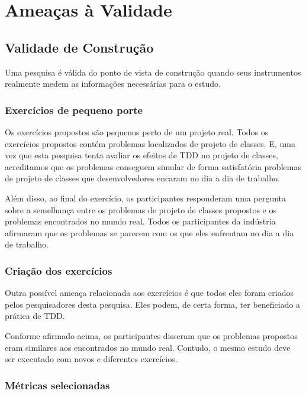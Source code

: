 \chapter{Ameaças à Validade}
\label{cap:ameacas}

\section{Validade de Construção}

Uma pesquisa é válida do ponto de vista de construção quando seus instrumentos realmente
medem as informações necessárias para o estudo.

\subsection{Exercícios de pequeno porte}

Os exercícios propostos são pequenos perto de um projeto real. Todos os exercícios propostos contém
problemas localizados de projeto de classes. E, uma vez que esta pesquisa tenta avaliar os efeitos de TDD no projeto de classes, 
acreditamos que os problemas conseguem simular de forma satisfatória
problemas de projeto de classes que desenvolvedores encaram no dia a dia de trabalho.

Além disso, ao final do exercício, os participantes responderam uma pergunta sobre a semelhança
entre os problemas de projeto de classes propostos e os problemas encontrados no mundo real.
Todos os participantes da indústria afirmaram que os problemas se parecem com os que eles enfrentam
no dia a dia de trabalho.

\subsection{Criação dos exercícios}

Outra possível ameaça relacionada aos exercícios é que todos eles foram criados pelos
pesquisadores desta pesquisa. Eles podem, de certa forma, ter beneficiado a prática
de TDD.

Conforme afirmado acima, os participantes disseram que os problemas propostos
eram similares aos encontrados no mundo real. Contudo, o mesmo estudo deve ser executado
com novos e diferentes exercícios.

\subsection{Métricas selecionadas}

